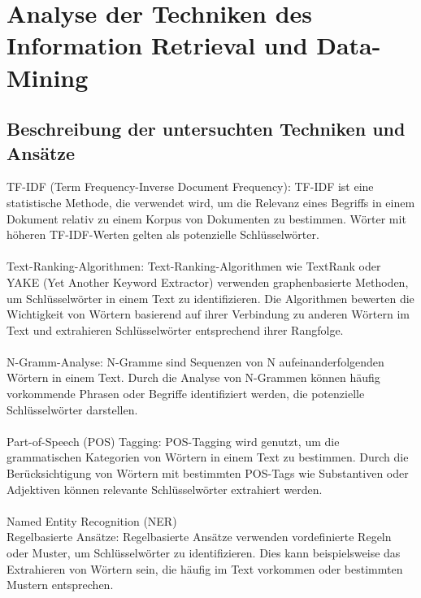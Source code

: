 \chapter{Analyse der Techniken des Information Retrieval und Data-Mining}
\label{chap:staffingadvisor}

\section{Beschreibung der untersuchten Techniken und Ansätze}
TF-IDF (Term Frequency-Inverse Document Frequency): TF-IDF ist eine statistische Methode, die verwendet wird, um die Relevanz eines Begriffs in einem Dokument relativ zu einem Korpus von Dokumenten zu bestimmen. Wörter mit höheren TF-IDF-Werten gelten als potenzielle Schlüsselwörter.\\ \cite{bafna2016document}\cite{ramos2003using}\\

Text-Ranking-Algorithmen: Text-Ranking-Algorithmen wie TextRank oder YAKE (Yet Another Keyword Extractor) verwenden graphenbasierte Methoden, um Schlüsselwörter in einem Text zu identifizieren. Die Algorithmen bewerten die Wichtigkeit von Wörtern basierend auf ihrer Verbindung zu anderen Wörtern im Text und extrahieren Schlüsselwörter entsprechend ihrer Rangfolge.\\ \cite{mihalcea2004textrank}\cite{zhang2020empirical}\cite{pay2019ensemble}\\

N-Gramm-Analyse: N-Gramme sind Sequenzen von N aufeinanderfolgenden Wörtern in einem Text. Durch die Analyse von N-Grammen können häufig vorkommende Phrasen oder Begriffe identifiziert werden, die potenzielle Schlüsselwörter darstellen.\\ \cite{pirk2019implementierung}\\


Part-of-Speech (POS) Tagging: POS-Tagging wird genutzt, um die grammatischen Kategorien von Wörtern in einem Text zu bestimmen. Durch die Berücksichtigung von Wörtern mit bestimmten POS-Tags wie Substantiven oder Adjektiven können relevante Schlüsselwörter extrahiert werden.\\ \cite{kumawat2015pos}\cite{nakagawa2007hybrid}\\

Named Entity Recognition (NER) \cite{mansouri2008named} \cite{nadeau2007survey}\cite{partalidou2019design}\\

Regelbasierte Ansätze: Regelbasierte Ansätze verwenden vordefinierte Regeln oder Muster, um Schlüsselwörter zu identifizieren. Dies kann beispielsweise das Extrahieren von Wörtern sein, die häufig im Text vorkommen oder bestimmten Mustern entsprechen.\\

